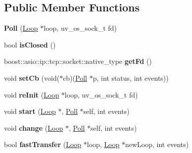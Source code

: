 \subsection*{Public Member Functions}
\begin{DoxyCompactItemize}
\item 
\mbox{\label{struct_poll_aade8fc2874809b30916f01da7f25e311}} 
{\bfseries Poll} (\mbox{\hyperlink{struct_loop}{Loop}} $\ast$loop, uv\+\_\+os\+\_\+sock\+\_\+t fd)
\item 
\mbox{\label{struct_poll_a613e86c977bb7ea71eacfb5568bc2138}} 
bool {\bfseries is\+Closed} ()
\item 
\mbox{\label{struct_poll_a87103417a8c87caa8351edb45d8f55ea}} 
boost\+::asio\+::ip\+::tcp\+::socket\+::native\+\_\+type {\bfseries get\+Fd} ()
\item 
\mbox{\label{struct_poll_a3ddbb71196969fe413d3cf1839614007}} 
void {\bfseries set\+Cb} (void($\ast$cb)(\mbox{\hyperlink{struct_poll}{Poll}} $\ast$p, int status, int events))
\item 
\mbox{\label{struct_poll_aee1dc4611ed13e45815e9f6f5e9c8de6}} 
void {\bfseries re\+Init} (\mbox{\hyperlink{struct_loop}{Loop}} $\ast$loop, uv\+\_\+os\+\_\+sock\+\_\+t fd)
\item 
\mbox{\label{struct_poll_a3268413bab124a7cd0858cc829f4677e}} 
void {\bfseries start} (\mbox{\hyperlink{struct_loop}{Loop}} $\ast$, \mbox{\hyperlink{struct_poll}{Poll}} $\ast$self, int events)
\item 
\mbox{\label{struct_poll_a1d04ee5275507b8c02b6f10d31acfb2c}} 
void {\bfseries change} (\mbox{\hyperlink{struct_loop}{Loop}} $\ast$, \mbox{\hyperlink{struct_poll}{Poll}} $\ast$self, int events)
\item 
\mbox{\label{struct_poll_af924777c7d22e9b178f1e466e61d18ba}} 
bool {\bfseries fast\+Transfer} (\mbox{\hyperlink{struct_loop}{Loop}} $\ast$loop, \mbox{\hyperlink{struct_loop}{Loop}} $\ast$new\+Loop, int events)
\item 
\mbox{\label{struct_poll_a5ba94f676bdf1f2dc2bbdab1b222aad5}} 

\end{DoxyCompactItemize}
